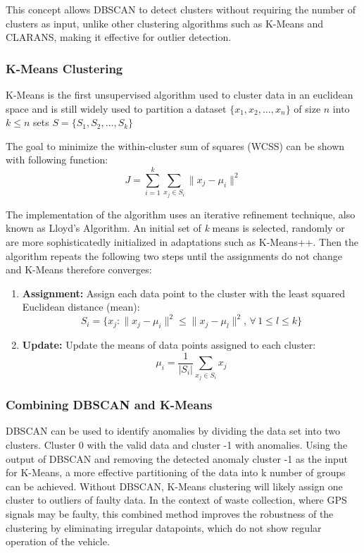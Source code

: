\documentclass[a4paper,12pt,twoside]{scrreprt}
\begin{document}
This concept allows DBSCAN to detect clusters without
requiring the number of clusters as input, unlike other clustering algorithms
such as K-Means and CLARANS, making it effective for outlier detection.
\cite{ester_density-based_nodate}

\subsubsection{K-Means Clustering}
K-Means is the first unsupervised algorithm used to cluster data in an
euclidean space and is still widely used to partition a dataset
$ \{x_1, x_2, \dots, x_n\}$ of size
$n$ into $k \leq n$ sets $S = \{S_1, S_2, \dots, S_k\}$ \cite{sinaga_pdf_2024}

The goal to minimize the within-cluster sum of squares (WCSS) can be shown with
following function:
\[
  J = \sum_{i=1}^{k} \sum_{x_j \in S_i} \| x_j - \mu_i \|^2
\]

The implementation of the algorithm uses an iterative refinement technique,
also known as Lloyd's Algorithm.
An initial set of \textit{k} means is selected, randomly or are more
sophisticatedly initialized in adaptations such as K-Means++.
Then the algorithm repeats the following two steps until the assignments do not
change and K-Means therefore converges:

\begin{enumerate}
  \item \textbf{Assignment:} Assign each data point to the cluster with the
        least squared Euclidean distance (mean):
        \[
          S_i = \{x_j : \| x_j - \mu_i \|^2 \leq \| x_j - \mu_l \|^2, \,
          \forall \, 1
          \leq l \leq k\}
        \]
  \item \textbf{Update:} Update the means of data points assigned to each
        cluster:
        \[
          \mu_i = \frac{1}{|S_i|} \sum_{x_j \in S_i} x_j
        \]
\end{enumerate}

\subsubsection{Combining DBSCAN and K-Means}
DBSCAN can be used to identify anomalies by dividing the data set into two
clusters. Cluster 0 with the valid data and cluster -1 with anomalies. Using
the output of DBSCAN and removing the detected anomaly cluster -1 as the input
for K-Means, a more effective partitioning of the data into k number of groups
can be achieved.
Without DBSCAN, K-Means clustering will likely assign one cluster to outliers
of faulty data.
In the context of waste collection, where GPS signals may be faulty, this
combined method improves the robustness of the clustering by eliminating
irregular datapoints, which do not show regular operation of the vehicle.
\end{document}
